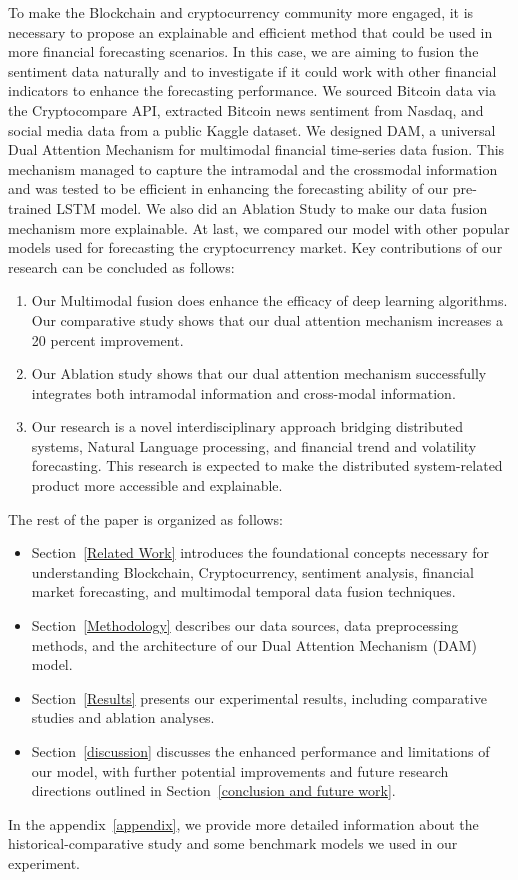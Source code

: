 To make the Blockchain and cryptocurrency community more engaged, it is necessary to propose an explainable and efficient method that could be used in more financial forecasting scenarios. In this case, we are aiming to fusion the sentiment data naturally and to investigate if it could work with other financial indicators to enhance the forecasting performance. We sourced Bitcoin data via the Cryptocompare API, extracted Bitcoin news sentiment from Nasdaq, and social media data from a public Kaggle dataset. We designed DAM, a universal Dual Attention Mechanism for multimodal financial time-series data fusion. This mechanism managed to capture the intramodal and the crossmodal information and was tested to be efficient in enhancing the forecasting ability of our pre-trained LSTM model. We also did an Ablation Study to make our data fusion mechanism more explainable. At last, we compared our model with other popular models used for forecasting the cryptocurrency market. Key contributions of our research can be concluded as follows:
\begin{enumerate}
    \item Our Multimodal fusion does enhance the efficacy of deep learning algorithms. Our comparative study shows that our dual attention mechanism increases a 20 percent improvement.
    \item Our Ablation study shows that our dual attention mechanism successfully integrates both intramodal information and cross-modal information.
    \item Our research is a novel interdisciplinary approach bridging distributed systems, Natural Language processing, and financial trend and volatility forecasting. This research is expected to make the distributed system-related product more accessible and explainable.
\end{enumerate}

The rest of the paper is organized as follows:
\begin{itemize}
\item Section~\ref{Related Work} introduces the foundational concepts necessary for understanding Blockchain, Cryptocurrency, sentiment analysis, financial market forecasting, and multimodal temporal data fusion techniques.
\item Section~\ref{Methodology} describes our data sources, data preprocessing methods, and the architecture of our Dual Attention Mechanism (DAM) model.
\item Section~\ref{Results} presents our experimental results, including comparative studies and ablation analyses.
\item Section~\ref{discussion} discusses the enhanced performance and limitations of our model, with further potential improvements and future research directions outlined in Section~\ref{conclusion and future work}.
\end{itemize}
In the appendix~\ref{appendix}, we provide more detailed information about the historical-comparative study and some benchmark models we used in our experiment.


